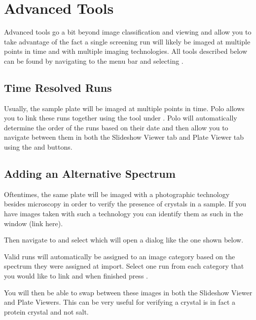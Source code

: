 \documentclass[letterpaper,10pt,english]{sphinxmanual}
\begin{document}
\section{Advanced Tools}
\label{\detokenize{user_guide:advanced-tools}}
Advanced tools go a bit beyond image classification and viewing and allow you
to take advantage of the fact a single screening run will likely be imaged at
multiple points in time and with multiple imaging technologies. All tools
described below can be found by navigating to the menu bar and selecting
.


\subsection{Time Resolved Runs}
\label{\detokenize{user_guide:time-resolved-runs}}
Usually, the sample plate will be imaged at multiple points in time. Polo allows
you to link these runs together using the  tool under
. Polo will automatically determine the order of the runs
based on their date and then allow you to navigate between them in both
the Slideshow Viewer tab and Plate Viewer tab using the  and
 buttons.


\subsection{Adding an Alternative Spectrum}
\label{\detokenize{user_guide:adding-an-alternative-spectrum}}
Oftentimes, the same plate will be imaged with a photographic technology
besides microscopy in order to verify the presence of crystals in a sample.
If you have images taken with such a technology you can identify them as such
in the  window (link here).

Then navigate to  and select  which will
open a dialog like the one shown below.

Valid runs will automatically be assigned to an image category based on the
spectrum they were assigned at import. Select one run from each category that
you would like to link and when finished press .

You will then be able to swap between these images in both the Slideshow Viewer
and Plate Viewers. This can be very useful for verifying a crystal is in fact
a protein crystal and not salt.
\end{document}

